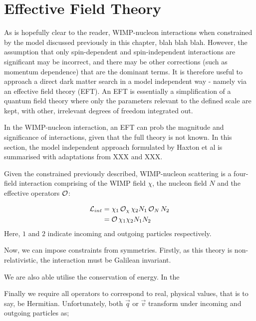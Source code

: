 \section{Effective Field Theory} \label{eft_theory}


\par
As is hopefully clear to the reader, WIMP-nucleon interactions when constrained by the model discussed previously in this chapter, blah blah blah.
However, the assumption that only spin-dependent and spin-independent interactions are significant may be incorrect, and there may be other corrections (such as momentum dependence) that are the dominant terms.
It is therefore useful to approach a direct dark matter search in a model independent way - namely via an effective field theory (EFT).
An EFT is essentially a simplification of a quantum field theory where only the parameters relevant to the defined scale are kept, with other, irrelevant degrees of freedom integrated out.

\par
In the WIMP-nucleon interaction, an EFT can prob the magnitude and significance of interactions, given that the full theory is not known.
In this section, the model independent approach formulated by Haxton et al is summarised with adaptations from XXX and XXX.

\par
Given the constrained previously described, WIMP-nucleon scattering is a four-field interaction comprising of the WIMP field $\chi$, the nucleon field $N$ and the effective operators $\operatorname{\mathcal{O}}$:

\begin{align}
\begin{split}
    \operatorname{\mathcal{L}}_{int} &= \chi_{1} \operatorname{\mathcal{O}}_{\chi} \chi_{2} N_{1} \operatorname{\mathcal{O}}_{N} N_{2} \\
                      &= \operatorname{\mathcal{O}} \chi_{1}\chi_{2} N_{1}N_{2}
\end{split}
\end{align}
Here, $1$ and $2$ indicate incoming and outgoing particles respectively.

\par
Now, we can impose constraints from symmetries.
Firstly, as this theory is non-relativistic, the interaction must be Galilean invariant.



\par
We are also able utilise the conservation of energy.
In the 

\par
Finally we require all operators to correspond to real, physical values, that is to say, be Hermitian.
Unfortunately, both $\vec{q}$ or $\vec{v}$ transform under incoming and outgoing particles as;


